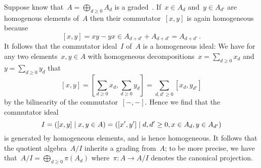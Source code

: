 Suppose know that~$A = \bigoplus_{d \geq 0} A_d$ is a graded~{\kalg}.
If~$x \in A_d$ and~$y \in A_{d'}$ are homogenous elements of~$A$ then their commutator~$[x,y]$ is again homogeneous because
\[
      [x,y]
  =   xy - yx
  \in A_{d + d'} + A_{d + d'}
  =   A_{d + d'} \,.
\]
It follows that the commutator ideal~$I$ of~$A$ is a homogeneous ideal:
We have for any two elements~$x, y \in A$ with homogeneous decompositions~$x = \sum_{d \geq 0} x_d$ and~$y = \sum_{d \geq 0} y_d$ that
\[
    [x,y]
  = \left[
      \sum_{d \geq 0} x_d,
      \sum_{d \geq 0} y_d
    \right]
  = \sum_{d, d' \geq 0} [x_d, y_{d'}]
\]
by the bilinearity of the commutator~$[-,-]$.
Hence we find that the commutator ideal
\[
    I
  = \genideal{ [x,y] \suchthat x, y \in A }
  = \genideal{ [x', y'] \suchthat d, d' \geq 0, x \in A_d, y \in A_{d'} }
\]
is generated by homogeneous elements, and is hence homogeneous.
It follows that the quotient algebra~$A/I$ inherits a grading from~$A$;
to be more precise, we have that~$A/I = \bigoplus_{d \geq 0} \pi(A_d)$ where~$\pi \colon A \to A/I$ denotes the canonical projection.

